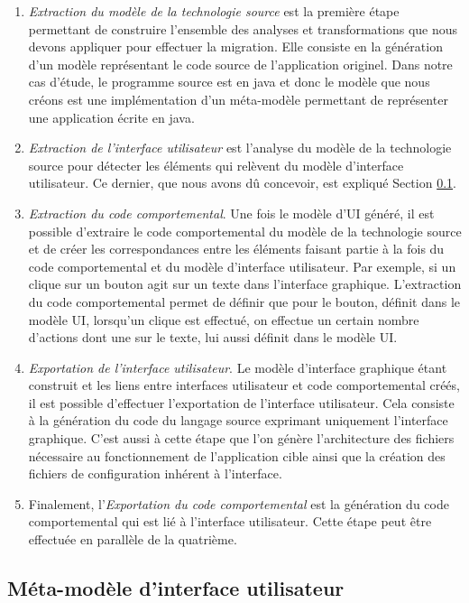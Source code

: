 \documentclass[11pt,]{article}
\providecommand{\tightlist}{%
  \setlength{\itemsep}{0pt}\setlength{\parskip}{0pt}}
\begin{document}
\begin{enumerate}
\def\labelenumi{\arabic{enumi}.}
\tightlist
\item
  \emph{Extraction du modèle de la technologie source} est la première
  étape permettant de construire l'ensemble des analyses et
  transformations que nous devons appliquer pour effectuer la migration.
  Elle consiste en la génération d'un modèle représentant le code source
  de l'application originel. Dans notre cas d'étude, le programme source
  est en java et donc le modèle que nous créons est une implémentation
  d'un méta-modèle permettant de représenter une application écrite en
  java.
\item
  \emph{Extraction de l'interface utilisateur} est l'analyse du modèle
  de la technologie source pour détecter les éléments qui relèvent du
  modèle d'interface utilisateur. Ce dernier, que nous avons dû
  concevoir, est expliqué Section \ref{sec:metamodelUI}.
\item
  \emph{Extraction du code comportemental}. Une fois le modèle d'UI
  généré, il est possible d'extraire le code comportemental du modèle de
  la technologie source et de créer les correspondances entre les
  éléments faisant partie à la fois du code comportemental et du modèle
  d'interface utilisateur. Par exemple, si un clique sur un bouton agit
  sur un texte dans l'interface graphique. L'extraction du code
  comportemental permet de définir que pour le bouton, définit dans le
  modèle UI, lorsqu'un clique est effectué, on effectue un certain
  nombre d'actions dont une sur le texte, lui aussi définit dans le
  modèle UI.
\item
  \emph{Exportation de l'interface utilisateur}. Le modèle d'interface
  graphique étant construit et les liens entre interfaces utilisateur et
  code comportemental créés, il est possible d'effectuer l'exportation
  de l'interface utilisateur. Cela consiste à la génération du code du
  langage source exprimant uniquement l'interface graphique. C'est aussi
  à cette étape que l'on génère l'architecture des fichiers nécessaire
  au fonctionnement de l'application cible ainsi que la création des
  fichiers de configuration inhérent à l'interface.
\item
  Finalement, l'\emph{Exportation du code comportemental} est la
  génération du code comportemental qui est lié à l'interface
  utilisateur. Cette étape peut être effectuée en parallèle de la
  quatrième.
\end{enumerate}

\hypertarget{sec:metamodelUI}{%
\subsection{Méta-modèle d'interface utilisateur}\label{sec:metamodelUI}}
\end{document}
